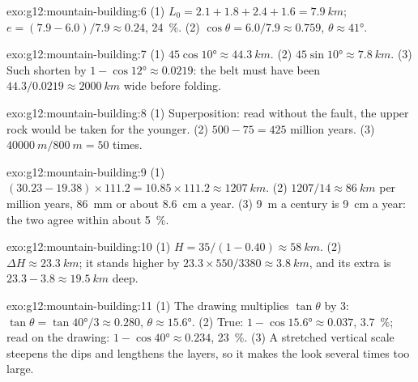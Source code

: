 \begin{solution}{exo:g12:mountain-building:6}
(1) $L_0 = 2.1 + 1.8 + 2.4 + 1.6 = \qty{7.9}{km}$;
$e = (7.9 - 6.0)/7.9 \approx 0.24$, \qty{24}{\percent}. (2) $\cos\theta =
6.0/7.9 \approx 0.759$, $\theta \approx \ang{41}$.
\end{solution}

\begin{solution}{exo:g12:mountain-building:7}
(1) $45\cos\ang{10} \approx \qty{44.3}{km}$. (2) $45\sin\ang{10} \approx
\qty{7.8}{km}$. (3) Such  shorten by $1 - \cos\ang{12} \approx 0.0219$:
the belt must have been $44.3/0.0219 \approx \qty{2000}{km}$ wide before
folding.
\end{solution}

\begin{solution}{exo:g12:mountain-building:8}
(1) Superposition: read without the fault, the upper rock would be taken
for the younger. (2) $500 - 75 = 425$ million years. (3) $\qty{40000}{m} /
\qty{800}{m} = 50$ times.
\end{solution}

\begin{solution}{exo:g12:mountain-building:9}
(1) $(30.23 - 19.38) \times 111.2 = 10.85 \times 111.2 \approx
\qty{1207}{km}$. (2) $1207/14 \approx \qty{86}{km}$ per million years,
\qty{86}{mm} or about \qty{8.6}{cm} a year. (3) \qty{9}{m} a century is
\qty{9}{cm} a year: the two agree within about \qty{5}{\percent}.
\end{solution}

\begin{solution}{exo:g12:mountain-building:10}
(1) $H = 35/(1 - 0.40) \approx \qty{58}{km}$. (2) $\Delta H \approx
\qty{23.3}{km}$; it stands higher by $23.3 \times 550/3380 \approx
\qty{3.8}{km}$, and its extra  is $23.3 - 3.8 \approx \qty{19.5}{km}$ deep.
\end{solution}

\begin{solution}{exo:g12:mountain-building:11}
(1) The drawing multiplies $\tan\theta$ by 3: $\tan\theta = \tan\ang{40}/3
\approx 0.280$, $\theta \approx \ang{15.6}$. (2) True: $1 - \cos\ang{15.6}
\approx 0.037$, \qty{3.7}{\percent}; read on the drawing: $1 - \cos\ang{40}
\approx 0.234$, \qty{23}{\percent}. (3) A stretched vertical scale steepens
the dips and lengthens the layers, so it makes the  look several
times too large.
\end{solution}

